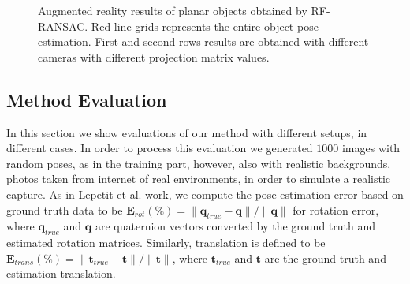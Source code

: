 \documentclass[annual]{acmsiggraph}
\begin{document}
\begin{figure}[t]
		
\caption{Augmented reality results of planar objects obtained by RF-RANSAC. Red line grids represents the entire object pose estimation. First and second rows results are obtained with different cameras with different projection matrix values.}
\label{img:resAR}
\end{figure} 
    

\subsection{Method Evaluation}
\label{subsec:results:evaluation}




In this section we show evaluations of our method with different setups, in different cases. In order to process this evaluation we generated $1000$ images with random poses, as in the training part, however, also with realistic backgrounds, photos taken from internet of real environments, in order to simulate a realistic capture. As in Lepetit et al. work, we compute the pose estimation error based on ground truth data to be $\mathbf{E}_{rot}(\%) = \| \mathbf{q}_{true} - \mathbf{q}\| / \|\mathbf{q}\|$ for rotation error, where $\mathbf{q}_{true}$ and $\mathbf{q}$ are quaternion vectors converted by the ground truth and estimated rotation matrices. Similarly, translation is defined to be $\mathbf{E}_{trans}(\%) = \| \mathbf{t}_{true} - \mathbf{t}\| / \|\mathbf{t}\|$, where $\mathbf{t}_{true}$ and $\mathbf{t}$ are the ground truth and estimation translation. 
\end{document}

